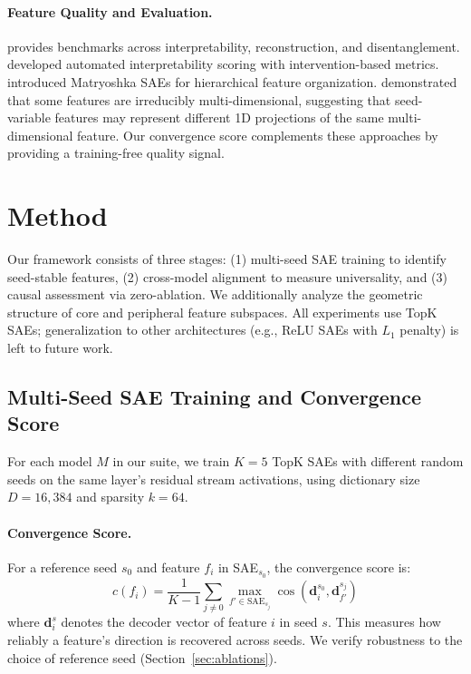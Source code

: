 \documentclass[final]{article}
\newcommand{\cscore}{c}
\begin{document}
\paragraph{Feature Quality and Evaluation.}
\citet{karvonen2025saebench} provides benchmarks across interpretability, reconstruction, and disentanglement. \citet{paulo2024autointerp} developed automated interpretability scoring with intervention-based metrics. \citet{bussmann2025matryoshka} introduced Matryoshka SAEs for hierarchical feature organization. \citet{engels2025multidim} demonstrated that some features are irreducibly multi-dimensional, suggesting that seed-variable features may represent different 1D projections of the same multi-dimensional feature. Our convergence score complements these approaches by providing a training-free quality signal.

\section{Method}
\label{sec:method}

Our framework consists of three stages: (1) multi-seed SAE training to identify seed-stable features, (2) cross-model alignment to measure universality, and (3) causal assessment via zero-ablation. We additionally analyze the geometric structure of core and peripheral feature subspaces. All experiments use TopK SAEs; generalization to other architectures (e.g., ReLU SAEs with $L_1$ penalty) is left to future work.

\subsection{Multi-Seed SAE Training and Convergence Score}

For each model $M$ in our suite, we train $K{=}5$ TopK SAEs \citep{gao2024scaling} with different random seeds on the same layer's residual stream activations, using dictionary size $D{=}16{,}384$ and sparsity $k{=}64$.

\paragraph{Convergence Score.} For a reference seed $s_0$ and feature $f_i$ in SAE$_{s_0}$, the convergence score is:
\begin{equation}
    \cscore(f_i) = \frac{1}{K-1} \sum_{j \neq 0} \max_{f' \in \text{SAE}_{s_j}} \cos(\mathbf{d}_i^{s_0}, \mathbf{d}_{f'}^{s_j})
    \label{eq:convergence}
\end{equation}
where $\mathbf{d}_i^{s}$ denotes the decoder vector of feature $i$ in seed $s$. This measures how reliably a feature's direction is recovered across seeds. We verify robustness to the choice of reference seed (Section~\ref{sec:ablations}).
\end{document}
